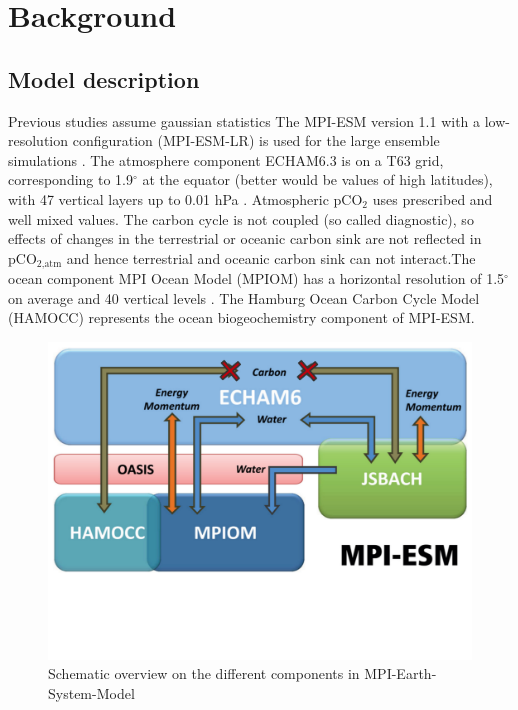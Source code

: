 \chapter{Background}\label{ch:background}



\section{Model description}
Previous studies assume gaussian statistics \citep{Thompson2015} \citep{Deser2012} 
The MPI-ESM version 1.1 with a low-resolution configuration (MPI-ESM-LR) is used for the large ensemble simulations \citep{Giorgetta2013}. The atmosphere component ECHAM6.3 is on a T63 grid, corresponding to 1.9$^\circ$ at the equator (better would be values of high latitudes), with 47 vertical layers up to 0.01 hPa \citep{Stevens2013}. 
Atmospheric pCO$_2$ uses prescribed and well mixed values. The carbon cycle is not coupled (so called diagnostic), so effects of changes in the terrestrial or oceanic carbon sink are not reflected in pCO$_{\text{2,atm}}$ and hence terrestrial and oceanic carbon sink can not interact.The ocean component MPI Ocean Model (MPIOM) has a horizontal resolution of 1.5$^\circ$ on average and 40 vertical levels \citep{Jungclaus2013}. The Hamburg Ocean Carbon Cycle Model (HAMOCC) \citep{Ilyina2013} represents the ocean biogeochemistry component of MPI-ESM. 

\begin{figure}[h]
	\centering 
	\includegraphics[scale=.42,trim=0cm 6cm 0cm 0cm,clip]{gfx/MPIESM.pdf}
	\caption{Schematic overview on the different components in MPI-Earth-System-Model}
	\label{fig:MPIESM}
\end{figure}

